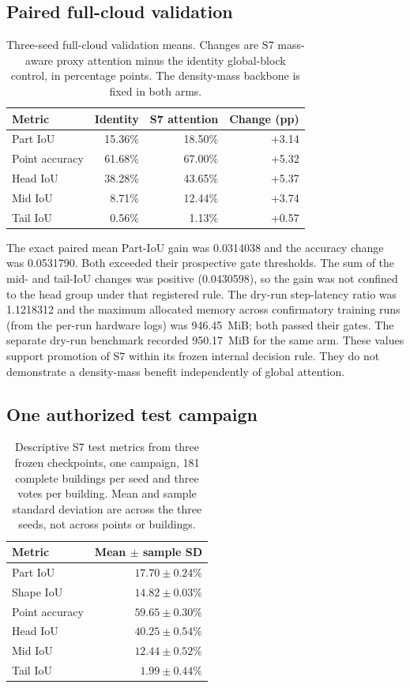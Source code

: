 \documentclass[11pt,a4paper]{article}
\begin{document}
\subsection{Paired full-cloud validation}

\begin{table}[htbp]
\centering
\caption{Three-seed full-cloud validation means. Changes are S7 mass-aware proxy attention minus the identity global-block control, in percentage points. The density-mass backbone is fixed in both arms.}
\label{tab:validation}
\begin{tabular}{lrrr}
\toprule
Metric & Identity & S7 attention & Change (pp) \\
\midrule
Part IoU & 15.36\% & 18.50\% & +3.14 \\
Point accuracy & 61.68\% & 67.00\% & +5.32 \\
Head IoU & 38.28\% & 43.65\% & +5.37 \\
Mid IoU & 8.71\% & 12.44\% & +3.74 \\
Tail IoU & 0.56\% & 1.13\% & +0.57 \\
\bottomrule
\end{tabular}
\end{table}

The exact paired mean Part-IoU gain was 0.0314038 and the accuracy change was 0.0531790. Both exceeded their prospective gate thresholds. The sum of the mid- and tail-IoU changes was positive (0.0430598), so the gain was not confined to the head group under that registered rule. The dry-run step-latency ratio was 1.1218312 and the maximum allocated memory across confirmatory training runs (from the per-run hardware logs) was 946.45~MiB; both passed their gates. The separate dry-run benchmark recorded 950.17~MiB for the same arm. These values support promotion of S7 within its frozen internal decision rule. They do not demonstrate a density-mass benefit independently of global attention.

\subsection{One authorized test campaign}

\begin{table}[htbp]
\centering
\caption{Descriptive S7 test metrics from three frozen checkpoints, one campaign, 181 complete buildings per seed and three votes per building. Mean and sample standard deviation are across the three seeds, not across points or buildings.}
\label{tab:test}
\begin{tabular}{lr}
\toprule
Metric & Mean $\pm$ sample SD \\
\midrule
Part IoU & $17.70\pm0.24$\% \\
Shape IoU & $14.82\pm0.03$\% \\
Point accuracy & $59.65\pm0.30$\% \\
Head IoU & $40.25\pm0.54$\% \\
Mid IoU & $12.44\pm0.52$\% \\
Tail IoU & $1.99\pm0.44$\% \\
\bottomrule
\end{tabular}
\end{table}
\end{document}
